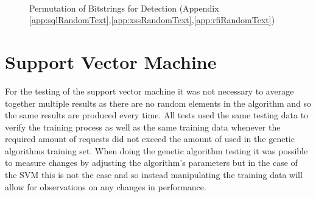 \begin{figure}[hb]
	\centering
	\\
	\caption{Permutation of Bitstrings for Detection (Appendix \ref{app:sqlRandomText},\ref{app:xssRandomText},\ref{app:rfiRandomText})}
	\label{fig:resRand}
\end{figure}

\section{Support Vector Machine}

For the testing of the support vector machine it was not necessary to average together multiple results as there are no random elements in the algorithm and so the same results are produced every time.  All tests used the same testing data to verify the training process as well as the same training data whenever the required amount of requests did not exceed the amount of used in the genetic algorithms training set.  When doing the genetic algorithm testing it was possible to measure changes by adjusting the algorithm's parameters but in the case of the SVM this is not the case and so instead manipulating the training data will allow for observations on any changes in performance.

